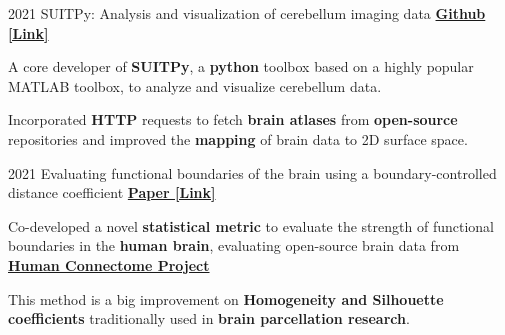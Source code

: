 

\begin{cventries}
    
  \cventry
    {2021} %
  	{SUITPy: Analysis and visualization of cerebellum imaging data} %
  	{\href{https://github.com/DiedrichsenLab/SUITPy}{\textbf{Github [Link]}}}
  	{}
    {
      \begin{cvitems} %
      	\item {A core developer of \textbf{SUITPy}, a \textbf{python} toolbox based on a highly popular MATLAB toolbox, to analyze and visualize cerebellum data.}
      	\item {Incorporated \textbf{HTTP} requests to fetch \textbf{brain atlases} from \textbf{open-source} repositories and improved the \textbf{mapping} of brain data to 2D surface space.}
      \end{cvitems}
    }
    
  \cventry
    {2021} %
    {Evaluating functional boundaries of the brain using a boundary-controlled distance coefficient} %
    {\href{https://www.biorxiv.org/content/10.1101/2021.05.11.443151v1.full.pdf}{\textbf{Paper [Link]}}}
    {}
    {
      \begin{cvitems} %
        \item {Co-developed a novel \textbf{statistical metric} to evaluate the strength of functional boundaries in the \textbf{human brain}, evaluating open-source brain data from \href{http://www.humanconnectomeproject.org/}{\textbf{Human Connectome Project}}}
        \item {This method is a big improvement on \textbf{Homogeneity and Silhouette coefficients} traditionally used in \textbf{brain parcellation research}.}
      \end{cvitems}
    }
    

\end{cventries}
